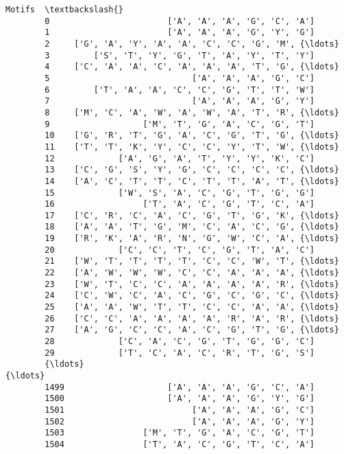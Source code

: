 \documentclass[11pt]{article}
\begin{document}
\begin{Verbatim}[commandchars=\\\{\}]
                                                         Motifs  \textbackslash{}
        0                        ['A', 'A', 'A', 'G', 'C', 'A']   
        1                        ['A', 'A', 'A', 'G', 'Y', 'G']   
        2     ['G', 'A', 'Y', 'A', 'A', 'C', 'C', 'G', 'M', {\ldots}   
        3         ['S', 'T', 'Y', 'G', 'T', 'A', 'Y', 'T', 'Y']   
        4     ['C', 'A', 'A', 'C', 'A', 'A', 'A', 'T', 'G', {\ldots}   
        5                             ['A', 'A', 'A', 'G', 'C']   
        6         ['T', 'A', 'A', 'C', 'C', 'G', 'T', 'T', 'W']   
        7                             ['A', 'A', 'A', 'G', 'Y']   
        8     ['M', 'C', 'A', 'W', 'A', 'W', 'A', 'T', 'R', {\ldots}   
        9                   ['M', 'T', 'G', 'A', 'C', 'G', 'T']   
        10    ['G', 'R', 'T', 'G', 'A', 'C', 'G', 'T', 'G', {\ldots}   
        11    ['T', 'T', 'K', 'Y', 'C', 'C', 'Y', 'T', 'W', {\ldots}   
        12             ['A', 'G', 'A', 'T', 'Y', 'Y', 'K', 'C']   
        13    ['C', 'G', 'S', 'Y', 'G', 'C', 'C', 'C', 'C', {\ldots}   
        14    ['A', 'C', 'T', 'T', 'C', 'T', 'T', 'A', 'T', {\ldots}   
        15             ['W', 'S', 'A', 'C', 'G', 'T', 'G', 'G']   
        16                  ['T', 'A', 'C', 'G', 'T', 'C', 'A']   
        17    ['C', 'R', 'C', 'A', 'C', 'G', 'T', 'G', 'K', {\ldots}   
        18    ['A', 'A', 'T', 'G', 'M', 'C', 'A', 'C', 'G', {\ldots}   
        19    ['R', 'K', 'A', 'R', 'N', 'G', 'W', 'C', 'A', {\ldots}   
        20             ['C', 'C', 'T', 'C', 'G', 'T', 'A', 'C']   
        21    ['W', 'T', 'T', 'T', 'T', 'C', 'C', 'W', 'T', {\ldots}   
        22    ['A', 'W', 'W', 'W', 'C', 'C', 'A', 'A', 'A', {\ldots}   
        23    ['W', 'T', 'C', 'C', 'A', 'A', 'A', 'A', 'R', {\ldots}   
        24    ['C', 'W', 'C', 'A', 'C', 'G', 'C', 'G', 'C', {\ldots}   
        25    ['A', 'A', 'W', 'T', 'T', 'C', 'C', 'A', 'A', {\ldots}   
        26    ['C', 'C', 'A', 'A', 'A', 'A', 'R', 'A', 'R', {\ldots}   
        27    ['A', 'G', 'C', 'C', 'A', 'C', 'G', 'T', 'G', {\ldots}   
        28             ['C', 'A', 'C', 'G', 'T', 'G', 'G', 'C']   
        29             ['T', 'C', 'A', 'C', 'R', 'T', 'G', 'S']   
        {\ldots}                                                 {\ldots}   
        1499                     ['A', 'A', 'A', 'G', 'C', 'A']   
        1500                     ['A', 'A', 'A', 'G', 'Y', 'G']   
        1501                          ['A', 'A', 'A', 'G', 'C']   
        1502                          ['A', 'A', 'A', 'G', 'Y']   
        1503                ['M', 'T', 'G', 'A', 'C', 'G', 'T']   
        1504                ['T', 'A', 'C', 'G', 'T', 'C', 'A']   

\end{Verbatim}
\end{document}
